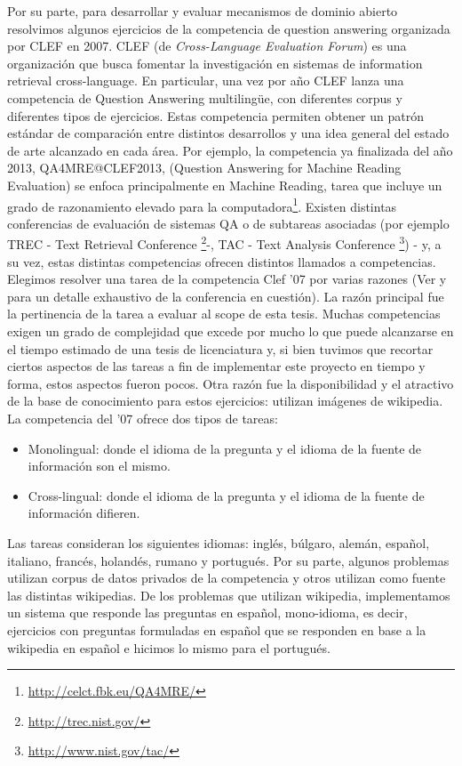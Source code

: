 Por su parte, para desarrollar y evaluar mecanismos de dominio abierto resolvimos algunos ejercicios de la competencia de question answering organizada por CLEF
en 2007. CLEF (de \textit{Cross-Language Evaluation Forum}) es una organización que busca fomentar la investigación en sistemas de information retrieval cross-language. En particular, una vez por año CLEF lanza una competencia de Question Answering multilingüe, con diferentes corpus y diferentes tipos de ejercicios. Estas competencia permiten obtener un patrón estándar de comparación entre distintos desarrollos y una idea general del estado de arte alcanzado en cada área.
Por ejemplo, la competencia ya finalizada del año 2013, QA4MRE@CLEF2013, (Question Answering for Machine Reading Evaluation) se enfoca principalmente en Machine Reading, tarea que incluye un grado de razonamiento elevado para la computadora\footnote{\url{http://celct.fbk.eu/QA4MRE/}}. Existen distintas conferencias de evaluación de sistemas QA o de subtareas asociadas (por ejemplo TREC - Text Retrieval Conference \footnote{\url{http://trec.nist.gov/}}-, TAC - Text Analysis Conference \footnote{\url{http://www.nist.gov/tac/}}) - y, a su vez, estas distintas competencias ofrecen distintos llamados a competencias. Elegimos resolver una tarea de la competencia Clef '07  por varias razones (Ver \cite{GuidelineClef07} y \cite{OverviewClef07} para un detalle exhaustivo de la conferencia en cuestión). La razón principal fue la pertinencia de la tarea a evaluar al scope de esta tesis. Muchas competencias exigen un grado de complejidad que excede por mucho lo que puede alcanzarse en el tiempo estimado de una tesis de licenciatura y, si bien tuvimos que recortar ciertos aspectos de las tareas a fin de implementar este proyecto en tiempo y forma, estos aspectos fueron pocos.
Otra razón fue la disponibilidad y el atractivo de la base de conocimiento para estos ejercicios: utilizan imágenes de wikipedia.
La competencia del '07 ofrece dos tipos de tareas:
\begin{itemize}
\item Monolingual: donde el idioma de la pregunta y el idioma de la fuente de información son el mismo.
\item Cross-lingual: donde el idioma de la pregunta y el idioma de la fuente de información difieren.
\end{itemize}
Las tareas consideran los siguientes idiomas: inglés, búlgaro, alemán, español, italiano, francés, holandés, rumano y portugués. Por su parte, algunos problemas utilizan corpus de datos privados de la competencia y otros utilizan como fuente las distintas wikipedias. De los problemas que utilizan wikipedia, implementamos un sistema que responde las preguntas en español, mono-idioma, es decir, ejercicios con preguntas formuladas en español que se responden en base a la wikipedia en español e hicimos lo mismo para el portugués. %
